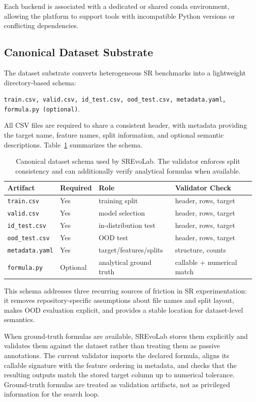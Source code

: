 Each backend is associated with a dedicated or shared conda environment, allowing the platform to support tools with incompatible Python versions or conflicting dependencies.

\subsection{Canonical Dataset Substrate}

The dataset substrate converts heterogeneous SR benchmarks into a lightweight directory-based schema:
\begin{center}
\texttt{train.csv, valid.csv, id\_test.csv, ood\_test.csv, metadata.yaml, formula.py (optional)}.
\end{center}
All CSV files are required to share a consistent header, with metadata providing the target name, feature names, split information, and optional semantic descriptions. Table~\ref{tab:dataset-schema} summarizes the schema.

\begin{table}[t]
\centering
\scriptsize
\begin{tabular}{llll}
\toprule
Artifact & Required & Role & Validator Check \\
\midrule
\texttt{train.csv} & Yes & training split & header, rows, target \\
\texttt{valid.csv} & Yes & model selection & header, rows, target \\
\texttt{id\_test.csv} & Yes & in-distribution test & header, rows, target \\
\texttt{ood\_test.csv} & Yes & OOD test & header, rows, target \\
\texttt{metadata.yaml} & Yes & target/features/splits & structure, counts \\
\texttt{formula.py} & Optional & analytical ground truth & callable + numerical match \\
\bottomrule
\end{tabular}
\caption{Canonical dataset schema used by SREvoLab. The validator enforces split consistency and can additionally verify analytical formulas when available.}
\label{tab:dataset-schema}
\end{table}

This schema addresses three recurring sources of friction in SR experimentation: it removes repository-specific assumptions about file names and split layout, makes OOD evaluation explicit, and provides a stable location for dataset-level semantics.

When ground-truth formulas are available, SREvoLab stores them explicitly and validates them against the dataset rather than treating them as passive annotations. The current validator imports the declared formula, aligns its callable signature with the feature ordering in metadata, and checks that the resulting outputs match the stored target column up to numerical tolerance. Ground-truth formulas are treated as validation artifacts, not as privileged information for the search loop.

